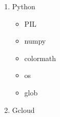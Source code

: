\begin{enumerate}
	\item Python
	\begin{itemize}
		\item PIL
		\item numpy
		\item colormath
		\item os
		\item glob
	\end{itemize}
	\item Gcloud
\end{enumerate}